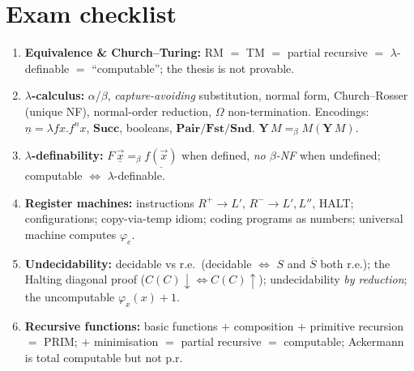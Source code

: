 \documentclass[11pt,a4paper]{article}
\newcommand{\cn}[1]{\underline{#1}}     %
\newcommand{\lam}{\lambda}
\newcommand{\beq}{=_\beta}
\begin{document}
\section*{Exam checklist}

\begin{must}
\begin{enumerate}[leftmargin=*,itemsep=2pt]
  \item \textbf{Equivalence \& Church--Turing:} RM $=$ TM $=$ partial recursive $=$ $\lambda$-definable $=$ ``computable''; the thesis is not provable.
  \item \textbf{$\lambda$-calculus:} $\alpha$/$\beta$, \emph{capture-avoiding} substitution, normal form, Church--Rosser (unique NF), normal-order reduction, $\Omega$ non-termination. Encodings: $\cn n=\lam fx.f^n x$, $\mathbf{Succ}$, booleans, $\mathbf{Pair/Fst/Snd}$. $\mathbf Y\,M\beq M(\mathbf Y\,M)$.
  \item \textbf{$\lambda$-definability:} $F\,\cn{\vec x}\beq\cn{f(\vec x)}$ when defined, \emph{no $\beta$-NF} when undefined; computable $\iff$ $\lambda$-definable.
  \item \textbf{Register machines:} instructions $R^{+}\to L'$, $R^{-}\to L',L''$, \textsf{HALT}; configurations; copy-via-temp idiom; coding programs as numbers; universal machine computes $\varphi_e$.
  \item \textbf{Undecidability:} decidable vs r.e.\ (decidable $\iff$ $S$ and $\overline S$ both r.e.); the Halting diagonal proof ($C(C){\downarrow}\iff C(C){\uparrow}$); undecidability \emph{by reduction}; the uncomputable $\varphi_x(x)+1$.
  \item \textbf{Recursive functions:} basic functions $+$ composition $+$ primitive recursion $=$ PRIM; $+$ minimisation $=$ partial recursive $=$ computable; Ackermann is total computable but not p.r.
\end{enumerate}
\end{must}
\end{document}
